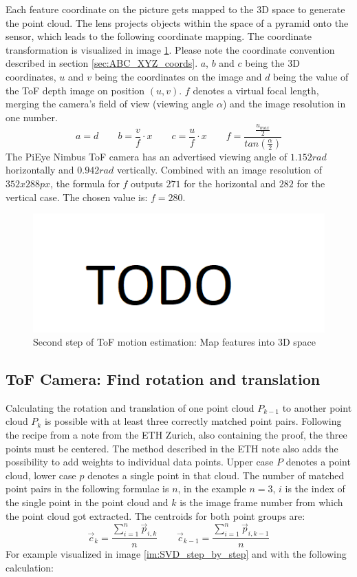 Each feature coordinate on the picture gets mapped to the 3D space to generate the point cloud. The lens projects objects within the space of a pyramid onto the sensor, which leads to the following coordinate mapping. The coordinate transformation is visualized in image \ref{im:SiftCoordTransform}. Please note the coordinate convention described in section \ref{sec:ABC_XYZ_coords}. $a$, $b$ and $c$ being the 3D coordinates, $u$ and $v$ being the coordinates on the image and $d$ being the value of the ToF depth image on position $(u,v)$. $f$ denotes a virtual focal length, merging the camera's field of view (viewing angle $\alpha$) and the image resolution in one number.
\begin{equation*}
    a = d \qquad b = \frac{v}{f}\cdot x \qquad c = \frac{u}{f}\cdot x \qquad f=\frac{\tfrac{u_{max}}{2}}{tan(\tfrac{\alpha}{2})}
\end{equation*}
The PiEye Nimbus ToF camera has an advertised viewing angle of $1.152rad$ horizontally and $0.942rad$ vertically. Combined with an image resolution of $352 x 288px$, the formula for $f$ outputs $271$ for the horizontal and $282$ for the vertical case. The chosen value is: $f = 280$.
\begin{figure}[H]
    \centering
    \includegraphics[width=1.0\textwidth]{images/todo.png}
    \caption{Second step of ToF motion estimation: Map features into 3D space}
    \label{im:SiftCoordTransform}
\end{figure}
\subsection{ToF Camera: Find rotation and translation}
\label{sec:ToFPosition_SVD}
Calculating the rotation and translation of one point cloud $P_{k-1}$ to another point cloud $P_{k}$ is possible with at least three correctly matched point pairs. Following the recipe from a note from the ETH Zurich, also containing the proof, the three points must be centered. The method described in the ETH note also adds the possibility to add weights to individual data points. Upper case $P$ denotes a point cloud, lower case $p$ denotes a single point in that cloud. The number of matched point pairs in the following formulae is $n$, in the example $n = 3$, $i$ is the index of the single point in the point cloud and $k$ is the image frame number from which the point cloud got extracted.
The centroids for both point groups are:
\begin{equation*}
    \vec{c}_{k}=\frac{\sum_{i=1}^n \vec{p}_{i,k}}{n} \qquad 
    \vec{c}_{k-1}=\frac{\sum_{i=1}^n \vec{p}_{i,k-1}}{n} 
\end{equation*}
For example visualized in image \ref{im:SVD_step_by_step} and with the following calculation:

